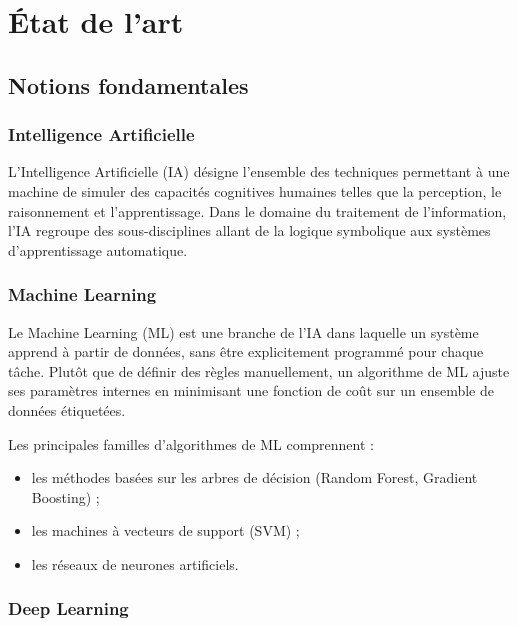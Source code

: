 
\chapter{État de l'art}
\label{chap:etat_art}

\section{Notions fondamentales}

\subsection{Intelligence Artificielle}

L'Intelligence Artificielle (IA) désigne l'ensemble des techniques permettant
à une machine de simuler des capacités cognitives humaines telles que la
perception, le raisonnement et l'apprentissage. Dans le domaine du traitement
de l'information, l'IA regroupe des sous-disciplines allant de la logique
symbolique aux systèmes d'apprentissage automatique.

\subsection{Machine Learning}

Le Machine Learning (ML) est une branche de l'IA dans laquelle un système
apprend à partir de données, sans être explicitement programmé pour chaque
tâche. Plutôt que de définir des règles manuellement, un algorithme de ML
ajuste ses paramètres internes en minimisant une fonction de coût sur un
ensemble de données étiquetées.

Les principales familles d'algorithmes de ML comprennent :
\begin{itemize}
  \item les méthodes basées sur les arbres de décision (Random Forest,
        Gradient Boosting) ;
  \item les machines à vecteurs de support (SVM) ;
  \item les réseaux de neurones artificiels.
\end{itemize}

\subsection{Deep Learning}

